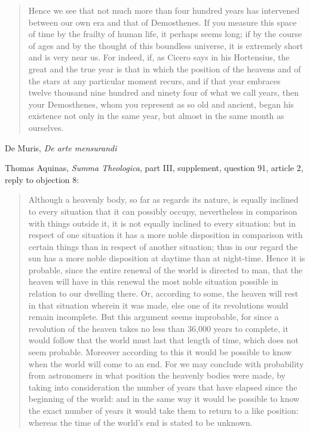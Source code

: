 \documentclass{amsart}
\theoremstyle{definition}
\begin{document}
\begin{quote}
Hence we see that not much more than four hundred years has intervened between our own era and that of Demosthenes. If you measure this space of time by the frailty of human life, it perhaps seems long; if by the course of ages and by the thought of this boundless universe, it is extremely short and is very near us. For indeed, if, as Cicero says in his Hortensius, the great and the true year is that in which the position of the heavens and of the stars at any particular moment recurs, and if that year embraces twelve thousand nine hundred and ninety four of what we call years, then your Demosthenes, whom you represent as so old and ancient, began his existence not only in the same year, but almost in the same month as ourselves.
\end{quote}

De Muris, {\em De arte mensurandi} \cite{mensurandi}

Thomas Aquinas, {\em Summa Theologica}, part III, supplement,
question 91, article 2, reply to objection 8:

\begin{quote}
Although a heavenly body, so far as regards its nature, is equally inclined to every situation that it can possibly occupy, nevertheless in comparison with things outside it, it is not
equally inclined to every situation: but in respect of one situation it has a more noble disposition in comparison with certain things than in respect of another situation; thus in our regard the sun has a more noble disposition at daytime than at night-time. Hence it is probable, since the entire renewal of the world is directed to man, that the heaven will have in this renewal the most noble situation possible in relation to our dwelling there. Or, according to some, the heaven will rest in that situation wherein it was made, else one of its revolutions would remain incomplete. But this argument seems improbable, for since a revolution of the heaven takes no less than 36,000 years to complete, it would follow that the world must last that length of time, which does not seem probable. Moreover according to this it would be possible to know when the world will come to an end. For we may conclude with probability from astronomers in what position the heavenly bodies were made, by taking into consideration the number of years that have elapsed since the beginning of the world: and in the same way it would be possible to know the exact number of years it would take them to return to a like position: whereas the time of the world's end is stated to be unknown.
\end{quote}
\end{document}
